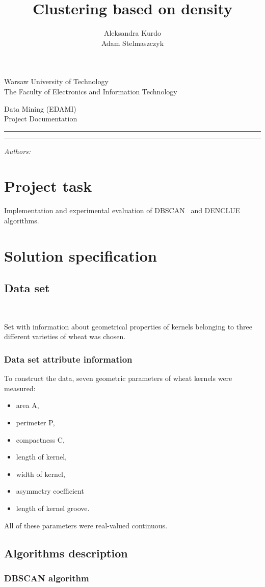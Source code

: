 \documentclass[12pt, a4paper, notitlepage, oneside]{article}
\title{Clustering based on density}
\author{Aleksandra Kurdo\\ Adam Stelmaszczyk}
\makeatletter
\newcommand{\linia}{\rule{\linewidth}{0.4mm}}
\renewcommand{\maketitle}{
\begin{titlepage}

    \vspace*{1cm}

    \begin{center}\small

    Warsaw University of Technology\\
    The Faculty of Electronics and Information Technology\\

    \end{center}

    \vspace{3cm}

     \begin{center}

    Data Mining (EDAMI)\\ Project Documentation

    \end{center}

    \noindent\linia

    \begin{center}

      \LARGE \textsc{\@title}

         \end{center}

     \noindent\linia

    \vspace{0.5cm}

    \begin{flushright}

    \begin{minipage}{5cm}

    \textit{\small Authors:}\\

    \normalsize \textsc{\@author} \par

    \end{minipage}

    \vspace{4cm}
    
 

     \end{flushright}

    \vspace*{\stretch{6}}

    \begin{center}

    \@date

    \end{center}

  \end{titlepage}
}
\makeatother
\begin{document}
\maketitle


\onehalfspacing


\section*{Project task}
Implementation and experimental evaluation of DBSCAN~\cite{dbscan} and DENCLUE~\cite{denclue} algorithms. 

\section*{Solution specification}

\subsection*{Data set}~\cite{dataset}

Set with information about geometrical properties of kernels belonging to three different varieties of wheat was chosen.

\subsubsection*{Data set attribute information}


To construct the data, seven geometric parameters of wheat kernels were measured: 

\begin{itemize}
	\item area A, 
	\item perimeter P, 
	\item compactness C, 
	\item length of kernel, 
	\item width of kernel, 
	\item asymmetry coefficient 
	\item length of kernel groove. 
\end{itemize}

All of these parameters were real-valued continuous.


\subsection*{Algorithms description}
 
\subsubsection*{DBSCAN algorithm}
\end{document}
